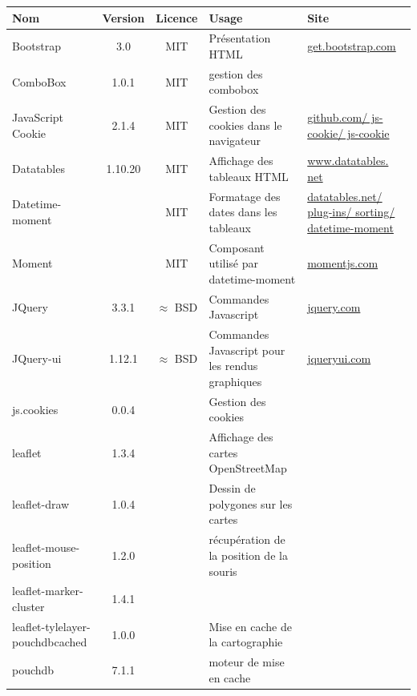 \begin{longtable}{|>{\raggedright\arraybackslash}p{3cm}|c|c|>{\raggedright\arraybackslash}p{3cm}|>{\raggedright\arraybackslash}p{3cm}|}
\hline 
\textbf{Nom} & \textbf{Version} & \textbf{Licence} & \textbf{Usage} & \textbf{Site} \\ 
\hline 
\endhead
Bootstrap & 3.0 & MIT & Présentation HTML & \href{http://getbootstrap.com}{get.bootstrap.com} \\ 
ComboBox & 1.0.1 & MIT & gestion des combobox & \\

JavaScript Cookie & 2.1.4 & MIT & Gestion des cookies dans le navigateur & \href{https://github.com/js-cookie/js-cookie}{github.com/ js-cookie/ js-cookie} \\ 

Datatables & 1.10.20 & MIT & Affichage des tableaux HTML & \href{http://www.datatables.net/}{www.datatables. net} \\ 

Datetime-moment &  & MIT & Formatage des dates dans les tableaux & \href{https://datatables.net/plug-ins/sorting/datetime-moment}{datatables.net/ plug-ins/ sorting/ datetime-moment} \\ 

Moment &  & MIT & Composant utilisé par datetime-moment & \href{http://momentjs.com} {momentjs.com}\\ 

JQuery & 3.3.1 & $\approx$ BSD & Commandes Javascript & \href{http://jquery.com/}{jquery.com} \\ 

JQuery-ui & 1.12.1 & $\approx$ BSD & Commandes Javascript pour les rendus graphiques & \href{http://jqueryui.com/}{jqueryui.com} \\ 

js.cookies & 0.0.4 & & Gestion des cookies & \\

leaflet & 1.3.4 & & Affichage des cartes OpenStreetMap & \\
leaflet-draw & 1.0.4 & & Dessin de polygones sur les cartes & \\
leaflet-mouse-position & 1.2.0 & & récupération de la position de la souris & \\
leaflet-marker-cluster & 1.4.1 & & & \\
leaflet-tylelayer-pouchdbcached & 1.0.0 & & Mise en cache de la cartographie & \\
pouchdb & 7.1.1 & & moteur de mise en cache & \\


\end{longtable}
